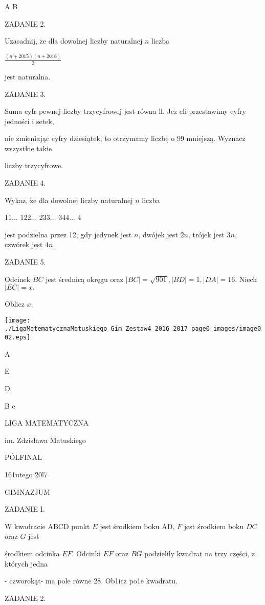 \documentclass[a4paper,12pt]{article}
\begin{document}
A  B

ZADANIE 2.

Uzasadnij, $\dot{\mathrm{z}}\mathrm{e}$ dla dowolnej liczby naturalnej $n$ liczba

$\displaystyle \frac{(n+2015)(n+2016)}{2}$

jest naturalna.

ZADANIE 3.

Suma cyfr pewnej liczby trzycyfrowej jest równa ll. $\mathrm{J}\mathrm{e}\dot{\mathrm{z}}$ eli przestawimy cyfry jedności i setek,

nie zmieniając cyfry dziesiątek, to otrzymamy liczbę o 99 mniejszą. Wyznacz wszystkie takie

liczby trzycyfrowe.

ZADANIE 4.

Wykaz, $\dot{\mathrm{z}}\mathrm{e}$ dla dowolnej liczby naturalnej $n$ liczba

11$\ldots$ 122$\ldots$ 233$\ldots$ 344$\ldots$ 4

jest podzielna przez 12, gdy jedynek jest $n$, dwójek jest $2n$, trójek jest $3n$, czwórek jest $4n.$

ZADANIE 5.

Odcinek $BC$ jest średnicą okręgu oraz $|BC|=\sqrt{901}, |BD|=1, |DA|=16$. Niech $|EC|=x.$

Oblicz $x.$
\begin{center}
\texttt{[image: ./LigaMatematycznaMatuskiego\_Gim\_Zestaw4\_2016\_2017\_page0\_images/image002.eps]}
\end{center}
A

E

D

B c






LIGA MATEMATYCZNA

im. Zdzisława Matuskiego

PÓLFINAL

161utego 20l7

GIMNAZJUM

ZADANIE I.

$\mathrm{W}$ kwadracie ABCD punkt $E$ jest środkiem boku AD, $F$ jest środkiem boku $DC$ oraz $G$ jest

środkiem odcinka $EF$. Odcinki $EF$ oraz $BG$ podzielily kwadrat na trzy części, z których jedna

- czworokąt- ma pole równe 28. Ob1icz po1e kwadratu.

ZADANIE 2.
\end{document}
